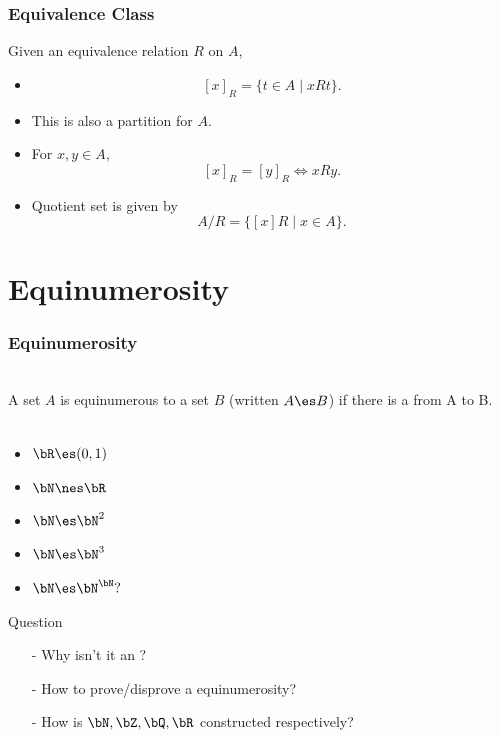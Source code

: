 \documentclass{beamer}
\begin{document}
\begin{frame}
    \frametitle{Equivalence Class}
    Given an equivalence relation $R$ on $A$,
    \begin{itemize}
        \item {} $$\left[ x\right]_R = \{t \in A \mid xRt\}.$$
        \item This is also a partition for $A$.
        \item For $x , y \in A$, $$\left[ x \right]_R  = \left[ y \right]_R \Leftrightarrow xRy.$$
        \item Quotient set is given by $$A/R = \{[x]R \mid x \in A\}.$$
    \end{itemize}
\end{frame}
\section{Equinumerosity}
\begin{frame}
    \frametitle{Equinumerosity}
    \\
    \hh A set $A$ is equinumerous to a set $B$ (written $A \es B$) if there is a 
     from A to B.
    \\
    \\
    \begin{itemize}
        \item $\bR \es (0,1)$
        \item $\bN \nes \bR$
        \item $\bN \es \bN^2$
        \item $\bN \es \bN^3$
        \item $\bN \es \bN^\bN?$
    \end{itemize}
    \begin{block}{Question}
        \begin{itemize}
            \item[-] Why isn't it an ?
            \item[-] How to prove/disprove a equinumerosity?
            \item[-] How is $\bN,\bZ,\bQ,\bR$ constructed respectively? 
        \end{itemize}
    \end{block}
\end{frame}
\end{document}
